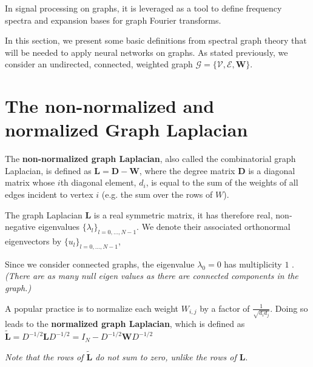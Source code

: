 \documentclass[sigconf]{acmart}
\begin{document}
In signal processing on graphs, it is leveraged as a tool to define frequency spectra and expansion bases for graph Fourier transforms.

In this section, we present some basic definitions from spectral graph theory that will be needed to apply neural networks on graphs. As stated previously, we consider an undirected, connected, weighted graph $\mathcal{G} = \{\mathcal{V}, \mathcal{E}, \mathbf{W}\}$. 

\section{The non-normalized and normalized Graph Laplacian}
The \textbf{non-normalized graph Laplacian}, also called the combinatorial graph Laplacian, is defined 
as $\mathbf{L} = \mathbf{D}-\mathbf{W}$, where the degree matrix $\mathbf{D}$ 
is a diagonal matrix 
whose $i$th diagonal element, $d_i$, is equal to the sum of the weights of all edges incident to vertex $i$
(e.g. the sum over the rows of ${W}$).

The graph Laplacian $\mathbf{L}$ is a real symmetric matrix, it has therefore real, non-negative eigenvalues $\{\lambda_l\}_{l=0, \dots, N-1}$. 
We denote their associated  orthonormal eigenvectors by $\{u_l\}_{l=0,\dots, N-1}$, %

Since we consider connected graphs, the eigenvalue $\lambda_0=0$ has multiplicity $1$  \cite{shuman_emerging_2013}. 
\textit{(There are as many null eigen values as there are connected components in the graph.)}

A popular practice is to normalize each weight $W_{i, j}$ by a factor of $\frac{1}{\sqrt{d_id_j}}$.
Doing so leads to the \textbf{normalized graph Laplacian}, which is defined as $\tilde{\mathbf{L}} = D^{-1/2}\mathbf{L}D^{-1/2} = I_N - D^{-1/2}\mathbf{W}D^{-1/2}$

\textit{Note that the rows of  $\tilde{\mathbf{L}}$ do not sum to zero, unlike the rows of $\mathbf{L}$}.
\end{document}
